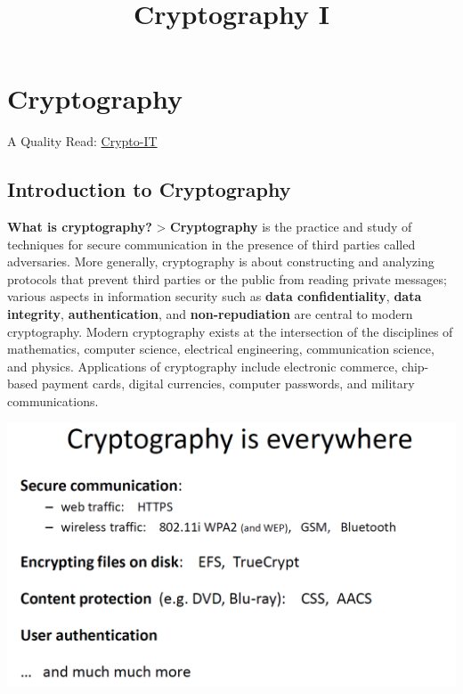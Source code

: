 \documentclass[11pt]{article}
\title{Cryptography I}
\makeatletter
\def\maxwidth{\ifdim\Gin@nat@width>\linewidth\linewidth
    \else\Gin@nat@width\fi}
\let\Oldincludegraphics\includegraphics
\renewcommand{\includegraphics}[1]{\Oldincludegraphics[width=.8\maxwidth]{#1}}
\makeatother
\begin{document}
    
    
    \maketitle
    
    

    
    \hypertarget{cryptography}{%
\section{Cryptography}\label{cryptography}}

A Quality Read:
\href{http://www.crypto-it.net/eng/index.html}{Crypto-IT}

    \hypertarget{introduction-to-cryptography}{%
\subsection{Introduction to
Cryptography}\label{introduction-to-cryptography}}

\textbf{What is cryptography?} \textgreater{} \textbf{Cryptography} is
the practice and study of techniques for secure communication in the
presence of third parties called adversaries. More generally,
cryptography is about constructing and analyzing protocols that prevent
third parties or the public from reading private messages; various
aspects in information security such as \textbf{data confidentiality},
\textbf{data integrity}, \textbf{authentication}, and
\textbf{non-repudiation} are central to modern cryptography. Modern
cryptography exists at the intersection of the disciplines of
mathematics, computer science, electrical engineering, communication
science, and physics. Applications of cryptography include electronic
commerce, chip-based payment cards, digital currencies, computer
passwords, and military communications.

\includegraphics{./Images/CryptoIsEverywhere.png}
\end{document}
